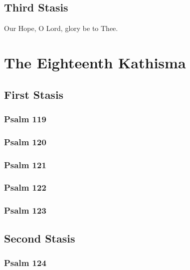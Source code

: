 \documentclass[12pt]{book}
\newcommand{\kathismabreak}{
  \medskip
  \begin{center}
  \begin{footnotesize}
  

  

  

  
  \end{footnotesize}
  \end{center}
  \smallbreak
}
\newcommand{\kathismaend}{
  \medskip
  \begin{center}
  \begin{footnotesize}
  

  

  Our Hope, O Lord, glory be to Thee.
  \end{footnotesize}
  \end{center}
  \smallbreak
}
\begin{document}



\kathismabreak

\subsection{Third Stasis}



\kathismaend

\section{The Eighteenth Kathisma}

\subsection{First Stasis}

\subsubsection{Psalm 119}


\subsubsection{Psalm 120}


\subsubsection{Psalm 121}


\subsubsection{Psalm 122}


\subsubsection{Psalm 123}


\kathismabreak

\subsection{Second Stasis}

\subsubsection{Psalm 124}

\end{document}
